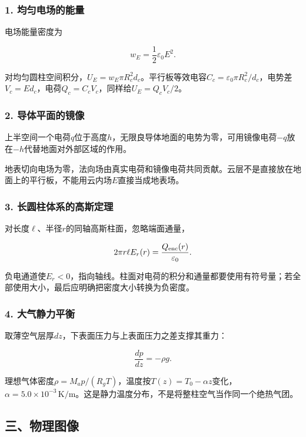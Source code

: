 \documentclass[12pt,a4paper,fontset=fandol]{ctexart}
\begin{document}
\subsubsection{1.
均匀电场的能量}\label{ux5747ux5300ux7535ux573aux7684ux80fdux91cf}

电场能量密度为

\[
w_E=\frac12\varepsilon_0E^2.
\]

对均匀圆柱空间积分，\(U_E=w_E\pi R_c^2d_c\)。平行板等效电容\(C_c=\varepsilon_0\pi R_c^2/d_c\)，电势差\(V_c=Ed_c\)，电荷\(Q_c=C_cV_c\)，同样给\(U_E=Q_cV_c/2\)。

\subsubsection{2.
导体平面的镜像}\label{ux5bfcux4f53ux5e73ux9762ux7684ux955cux50cf}

上半空间一个电荷\(q\)位于高度\(h\)，无限良导体地面的电势为零，可用镜像电荷\(-q\)放在\(-h\)代替地面对外部区域的作用。

地表切向电场为零，法向场由真实电荷和镜像电荷共同贡献。云层不是直接放在地面上的平行板，不能用云内场\(E\)直接当成地表场。

\subsubsection{3.
长圆柱体系的高斯定理}\label{ux957fux5706ux67f1ux4f53ux7cfbux7684ux9ad8ux65afux5b9aux7406}

对长度\(\ell\)、半径\(r\)的同轴高斯柱面，忽略端面通量，

\[
2\pi r\ell E_r(r)=\frac{Q_{\rm enc}(r)}{\varepsilon_0}.
\]

负电通道使\(E_r<0\)，指向轴线。柱面对电荷的积分和通量都要使用有符号量；若全部使用大小，最后应明确把密度大小转换为负密度。

\subsubsection{4.
大气静力平衡}\label{ux5927ux6c14ux9759ux529bux5e73ux8861}

取薄空气层厚\(dz\)，下表面压力与上表面压力之差支撑其重力：

\[
\frac{dp}{dz}=-\rho g.
\]

理想气体密度\(\rho=M_ap/(R_gT)\)，温度按\(T(z)=T_0-\alpha z\)变化，\(\alpha=5.0\times10^{-3}\,\mathrm{K/m}\)。这是静力温度分布，不是将整柱空气当作同一个绝热气团。

\subsection{三、物理图像}\label{ux4e09ux7269ux7406ux56feux50cf-6}
\end{document}
